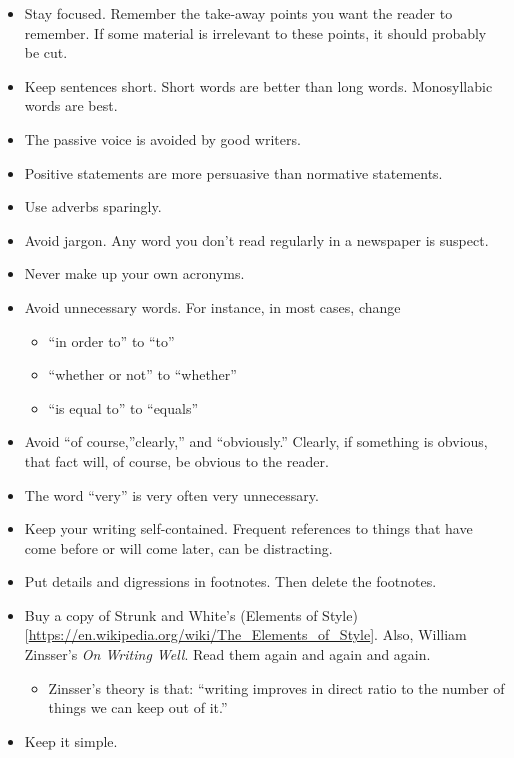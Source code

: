 \documentclass[
]{book}
\providecommand{\tightlist}{%
  \setlength{\itemsep}{0pt}\setlength{\parskip}{0pt}}
\begin{document}
\begin{itemize}
\tightlist
\item
  Stay focused. Remember the take-away points you want the reader to remember. If some material is irrelevant to these points, it should probably be cut.
\item
  Keep sentences short. Short words are better than long words. Monosyllabic words are best.
\item
  The passive voice is avoided by good writers.
\item
  Positive statements are more persuasive than normative statements.
\item
  Use adverbs sparingly.
\item
  Avoid jargon. Any word you don't read regularly in a newspaper is suspect.
\item
  Never make up your own acronyms.
\item
  Avoid unnecessary words. For instance, in most cases, change

  \begin{itemize}
  \tightlist
  \item
    ``in order to'' to ``to''
  \item
    ``whether or not'' to ``whether''
  \item
    ``is equal to'' to ``equals''
  \end{itemize}
\item
  Avoid ``of course,''clearly,'' and ``obviously.'' Clearly, if something is obvious, that fact will, of course, be obvious to the reader.
\item
  The word ``very'' is very often very unnecessary.
\item
  Keep your writing self-contained. Frequent references to things that have come before or will come later, can be distracting.
\item
  Put details and digressions in footnotes. Then delete the footnotes.
\item
  Buy a copy of Strunk and White's (Elements of Style){[}\url{https://en.wikipedia.org/wiki/The_Elements_of_Style}{]}. Also, William Zinsser's \emph{On Writing Well}. Read them again and again and again.

  \begin{itemize}
  \tightlist
  \item
    Zinsser's theory is that: ``writing improves in direct ratio to the number of things we can keep out of it.''
  \end{itemize}
\item
  Keep it simple.
\end{itemize}
\end{document}

